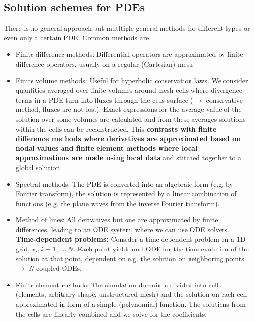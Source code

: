 \subsection{Solution schemes for PDEs}
There is no general approach but mutltiple general
methods for different types or even only a certain PDE.
Common methods are
\begin{itemize}
    \item \textcolor{blue1}{Finite difference methods:} Differential operators are approximated by finite difference operators, usually on a regular (Cartesian) mesh
    \item \textcolor{blue1}{Finite volume methods:} Useful for hyperbolic conservation 
    laws. We consider quantities averaged over finite volumes around mesh cells where 
    divergence terms in a PDE turn into fluxes through the cells surface ($\rightarrow$ conservative 
    method, fluxes are not lost). Exact expressions for the average value of the solution over some volumes 
    are calculated and from these averages solutions within the cells can be reconstructed. This \textbf{contrasts with 
    finite difference methods where derivatives are approximated based on nodal values and finite element 
    methods where local approximations are made using local data} and stitched together to a global solution.
    \item \textcolor{blue1}{Spectral methods:} The PDE is converted into an algebraic form (e.g. by Fourier transform), the solution is represented by a linear combination of functions (e.g. the plane waves from the inverse Fourier transform).
    \item \textcolor{blue1}{Method of lines:} All derivatives but one are approximated by finite differences, leading to an ODE system, where we can use ODE solvers. \textbf{Time-dependent problems:} Consider a time-dependent problem on a 1D grid, $x_i, i=1,...,N$. Each point yields and ODE for the time evolution of the solution at that point, dependent on e.g. the solution on neighboring points $\rightarrow$ $N$ coupled ODEs.
    \item \textcolor{blue1}{Finite element methods:} The simulation domain is divided into cells (elements, arbitrary shape, unstructured mesh) and the solution on each cell approximated in form of a simple (polynomial) function. The solutions from the cells are linearly combined and we solve for the coefficients.
\end{itemize}

